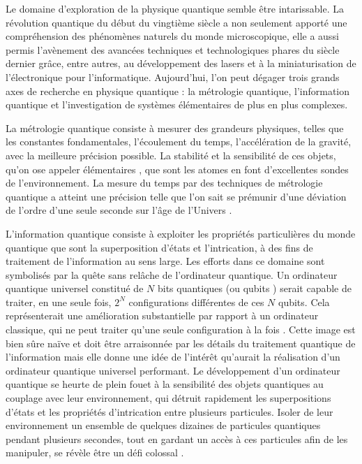 \bigskip
Le domaine d'exploration de la physique quantique semble être intarissable.
La \og révolution quantique \fg{} du début du vingtième siècle a non seulement apporté une compréhension des phénomènes naturels du monde microscopique, elle a aussi permis l'avènement des avancées techniques et technologiques phares du siècle dernier grâce, entre autres, au développement des lasers et à la miniaturisation de l'électronique pour l'informatique.
Aujourd'hui, l'on peut dégager trois grands axes de recherche en physique quantique : la métrologie quantique, l'information quantique et l'investigation de systèmes élémentaires de plus en plus complexes.

La métrologie quantique consiste à mesurer des grandeurs physiques, telles que les constantes fondamentales, l'écoulement du temps, l'accélération de la gravité, avec la meilleure précision possible.
La stabilité et la sensibilité de ces objets, qu'on ose appeler \og élémentaires \fg{}, que sont les atomes en font d'excellentes sondes de l'environnement.
La mesure du temps par des techniques de métrologie quantique a atteint une précision telle que l'on sait se prémunir d'une déviation de l'ordre d'une seule seconde sur l'âge de l'Univers \cite{Ludlow2015,Oates2013}.

L'information quantique consiste à exploiter les propriétés particulières du monde quantique que sont la superposition d'états et l'intrication, à des fins de traitement de l'information au sens large.
Les efforts dans ce domaine sont symbolisés par la quête sans relâche de l'ordinateur quantique.
Un ordinateur quantique universel constitué de $N$ bits quantiques (ou \og qubits \fg{}) serait capable de traiter, en une seule fois, $2^N$ configurations différentes de ces $N$ qubits.
Cela représenterait une amélioration substantielle par rapport à un ordinateur classique, qui ne peut traiter qu'une seule configuration à la fois \cite{deutsch1985}.
Cette image est bien sûre naïve et doit être arraisonnée par les détails du traitement quantique de l'information mais elle donne une idée de l'intérêt qu'aurait la réalisation d'un ordinateur quantique universel performant.
Le développement d'un ordinateur quantique se heurte de plein fouet à la sensibilité des objets quantiques au couplage avec leur environnement, qui détruit rapidement les superpositions d'états et les propriétés d'intrication entre plusieurs particules.
Isoler de leur environnement un ensemble de quelques dizaines de particules quantiques pendant plusieurs secondes, tout en gardant un accès à ces particules afin de les manipuler, se révèle être un défi colossal \cite{QM_ZUREKDECOH91}.

